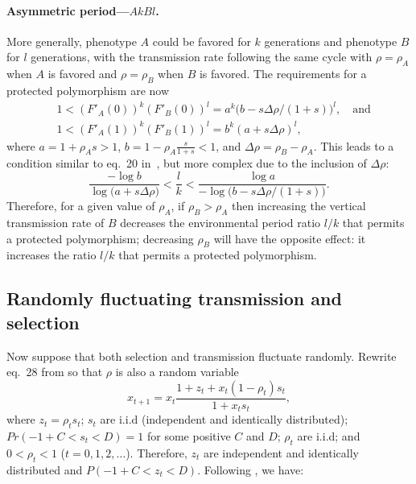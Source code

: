 \documentclass[14pt]{extarticle}
\begin{document}
\paragraph{Asymmetric period---$AkBl$.}
More generally, phenotype $A$ could be favored for $k$ generations and phenotype $B$ for $l$ generations, with the transmission rate following the same cycle with $\rho=\rho_A$ when $A$ is favored and $\rho=\rho_B$ when $B$ is favored.
The requirements for a protected polymorphism are now
\begin{equation}\begin{aligned}
& 1 < (F'_A(0))^k (F'_B(0))^l = a^k \big(b - s \Delta \rho /(1+s)\big)^l, \quad \text{and} \\
& 1 < (F'_A(1))^k (F'_B(1))^l = b^k (a + s \Delta \rho)^l,
\end{aligned}\end{equation}
where $a=1+\rho_A s>1$, $b=1-\rho_A\frac{s}{1+s}<1$, and $\Delta \rho = \rho_B - \rho_A$.
This leads to a condition similar to eq.~20 in~\citet{Ram2018}, but more complex due to the inclusion of $\Delta \rho$:
\begin{equation} \label{eq:poly_condition_periodic_fluc_k_l}
\frac{-\log{b}}{\log{\big(a + s \Delta \rho \big)}} < 
\frac{l}{k} < 
\frac{\log{a}}{-\log{\big(b - s \Delta \rho/(1+s)\big)}}.
\end{equation}
Therefore, for a given value of $\rho_A$, if $\rho_B>\rho_A$ then increasing the vertical transmission rate of $B$ decreases the environmental period ratio $l/k$ that permits a protected polymorphism; decreasing $\rho_B$  will have the opposite effect: it increases the ratio $l/k$ that permits a protected polymorphism.

\subsection*{Randomly fluctuating transmission and selection}

Now suppose that both selection and transmission fluctuate randomly.
Rewrite eq.~28 from \citet{Ram2018} so that $\rho$ is also a random variable
\begin{equation}
x_{t+1} = x_t \frac{1 + z_t + x_t (1 - \rho_t) s_t}{1 + x_t s_t},
\end{equation}
where $z_t=\rho_t s_t$; $s_t$ are i.i.d (independent and identically distributed); $Pr(-1+C<s_t<D)=1$ for some positive $C$ and $D$; $\rho_t$ are i.i.d; and  $0<\rho_t<1$ ($t=0,1,2,\ldots$).
Therefore, $z_t$ are independent and identically distributed and $P(-1+C < z_t < D)$.  Following \citet{Karlin1974}, we have:
\end{document}
